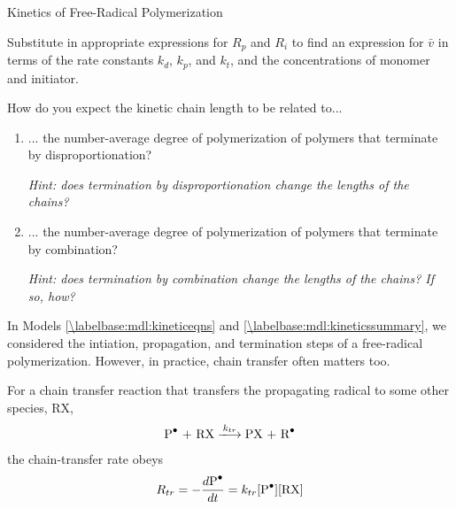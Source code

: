 \begin{activity}{Kinetics of Free-Radical Polymerization}
\begin{ctqs}
	\question Substitute in appropriate expressions for $R_p$ and $R_i$ to find an expression for $\bar v$ in terms of the rate constants $k_d$, $k_p$, and $k_t$, and the concentrations of monomer and initiator.
	
		\begin{solution}[2.5in]
		\end{solution}
		
	\question How do you expect the kinetic chain length to be related to...
		
		\begin{enumerate}
		
			\item ... the number-average degree of polymerization of polymers that terminate by disproportionation?
			
				\emph{Hint: does termination by disproportionation change the lengths of the chains?}
				
				\begin{solution}[1in]
				\end{solution}
			
			\item ... the number-average degree of polymerization of polymers that terminate by combination?
			
				\emph{Hint: does termination by combination change the lengths of the chains?  If so, how?}
				
				\begin{solution}[1in]
				\end{solution}
		
		\end{enumerate}

\end{ctqs}

		
\clearpage
\begin{model}
\label{\labelbase:mdl:chainxfer}

	In Models \ref{\labelbase:mdl:kineticeqns} and \ref{\labelbase:mdl:kineticssummary}, we considered the intiation, propagation, and termination steps of a free-radical polymerization.  However, in practice, chain transfer often matters too.
	
	For a chain transfer reaction that transfers the propagating radical to some other species, RX,
	\begin{align*}
		\text{\ce{P^.} + RX} \xlongrightarrow{k_{tr}} \text{PX + \ce{R^.}}
	\end{align*}
	the chain-transfer rate obeys
	\begin{align*}
		R_{tr} = -\frac{d\text{\ce{P^.}}}{dt} = k_{tr}\text{[\ce{P^.}][RX]}
	\end{align*}
	

\end{model}
\end{activity}

